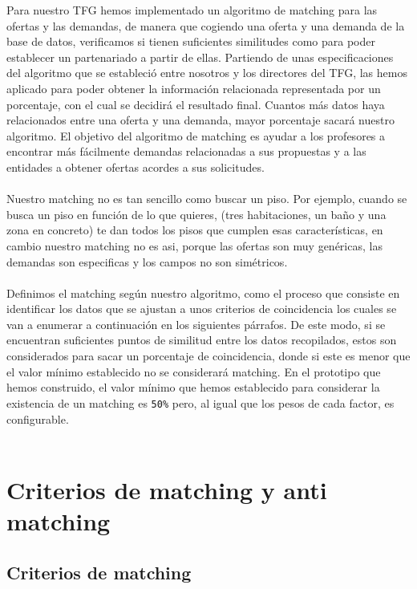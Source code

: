 \documentclass[11pt]{book}
\begin{document}
Para nuestro TFG hemos implementado un algoritmo de matching para las ofertas y las demandas, de manera que cogiendo una oferta y una demanda de la base de datos, verificamos si tienen suficientes similitudes como para poder establecer un partenariado a partir de ellas. Partiendo de unas especificaciones del algoritmo que se estableció entre nosotros y los directores del TFG, las hemos aplicado para poder obtener la información relacionada representada por un porcentaje, con el cual se decidirá el resultado final.  Cuantos más datos haya relacionados entre una oferta y una demanda, mayor porcentaje sacará nuestro algoritmo. El objetivo del algoritmo de matching es ayudar a los profesores a encontrar más fácilmente demandas relacionadas a sus propuestas y a las entidades a obtener ofertas acordes a sus solicitudes. \\\\
Nuestro matching no es tan sencillo como buscar un piso. Por ejemplo, cuando se busca un piso en función de lo que quieres, (tres habitaciones, un baño y una zona en concreto) te dan todos los pisos que cumplen esas características, en cambio nuestro matching no es asi, porque las ofertas son muy genéricas, las demandas son especificas y los campos no son simétricos.\\\\

Definimos el matching según nuestro algoritmo, como el proceso que consiste en identificar los datos que se ajustan a unos criterios de coincidencia los cuales se van a enumerar a continuación en los siguientes párrafos. De este modo, si se encuentran suficientes puntos de similitud entre los datos recopilados, estos son considerados para sacar un porcentaje de coincidencia, donde si este es menor que el valor mínimo establecido no se considerará matching. En el prototipo que hemos construido, el valor mínimo que hemos
establecido para considerar la existencia de un matching es \texttt{50\%} pero, al
igual que los pesos de cada factor, es configurable.
\\\\

\section{Criterios de matching y anti matching}
\subsection{Criterios de matching }
\end{document}
